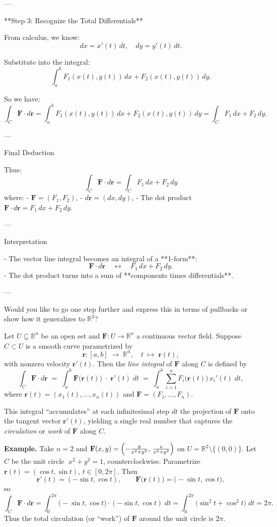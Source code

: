 \documentclass[11pt,openany]{article}
\renewcommand{\vec}[1]{\mathbf{#1}}
\begin{document}
---

 **Step 3: Recognize the Total Differentials**

From calculus, we know:
\[
dx = x'(t)\,dt, \quad dy = y'(t)\,dt.
\]

Substitute into the integral:
\[
\int_a^b F_1(x(t), y(t))\,dx + F_2(x(t), y(t))\,dy.
\]

So we have:
\[
\int_C \vec{F} \cdot d\vec{r}
= \int_a^b F_1(x(t), y(t))\,dx + F_2(x(t), y(t))\,dy
= \int_C F_1\,dx + F_2\,dy.
\]

---

Final Deduction

Thus:
\[
\boxed{
	\int_C \vec{F} \cdot d\vec{r}
	= \int_C F_1\,dx + F_2\,dy
}
\]
where:
- \( \vec{F} = (F_1, F_2) \),
- \( d\vec{r} = (dx, dy) \),
- The dot product \( \vec{F} \cdot d\vec{r} = F_1\,dx + F_2\,dy \).

---

 Interpretation

- The vector line integral becomes an integral of a **1-form**:  
\[
\vec{F} \cdot d\vec{r} \quad \leftrightarrow \quad F_1\,dx + F_2\,dy.
\]
- The dot product turns into a sum of **components times differentials**.

---

Would you like to go one step further and express this in terms of pullbacks or show how it generalizes to \( \mathbb{R}^3 \)?

\newpage
Let \(U\subseteq\mathbb{R}^n\) be an open set and 
\(\displaystyle\mathbf F:U\to\mathbb{R}^n\) a continuous vector field.  
Suppose \(C\subset U\) is a smooth curve parametrized by
\[
\mathbf r\colon [a,b]\;\longrightarrow\;\mathbb{R}^n,
\quad
t\;\mapsto\;\mathbf r(t),
\]
with nonzero velocity \(\mathbf r'(t)\).  Then the \emph{line integral} of \(\mathbf F\) along \(C\) is defined by
\[
\boxed{
	\int_C\mathbf F\!\cdot d\mathbf r
	\;=\;
	\int_a^b
	\mathbf F\bigl(\mathbf r(t)\bigr)\;\cdot\;\mathbf r'(t)\;dt
	\;=\;
	\int_a^b
	\sum_{i=1}^n F_i\bigl(\mathbf r(t)\bigr)\,x_i'(t)\;dt,
}
\]
where \(\mathbf r(t)=(x_1(t),\dots,x_n(t))\) and 
\(\mathbf F=(F_1,\dots,F_n)\).  

\medskip

\noindent
This integral “accumulates” at each infinitesimal step \(dt\) the projection of \(\mathbf F\) onto the tangent vector \(\mathbf r'(t)\), yielding a single real number that captures the \emph{circulation} or \emph{work} of \(\mathbf F\) along \(C\).

\bigskip

\noindent\textbf{Example.}  Take \(n=2\) and 
\(\displaystyle \mathbf F(x,y)
=\Bigl(-\tfrac{y}{x^2+y^2},\,\tfrac{x}{x^2+y^2}\Bigr)\)
on \(U=\mathbb{R}^2\setminus\{(0,0)\}\).  Let \(C\) be the unit circle 
\(\;x^2+y^2=1\), counterclockwise.  Parametrize
\(\mathbf r(t)=(\cos t,\sin t)\), \(t\in[0,2\pi]\).  Then
\[
\mathbf r'(t)=(-\sin t,\cos t),\qquad
\mathbf F\bigl(\mathbf r(t)\bigr)
=\bigl(-\sin t,\cos t\bigr),
\]
so
\[
\int_C\mathbf F\!\cdot d\mathbf r
=\int_0^{2\pi}
\bigl(-\sin t,\cos t\bigr)\cdot(-\sin t,\cos t)\;dt
=\int_0^{2\pi}
\bigl(\sin^2t+\cos^2t\bigr)\;dt
=2\pi.
\]
Thus the total circulation (or “work”) of \(\mathbf F\) around the unit circle is \(2\pi\).
\end{document}

